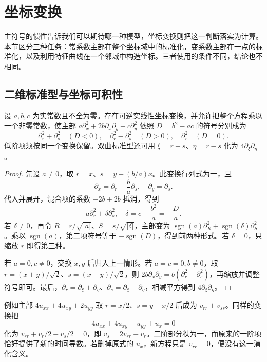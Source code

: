 \section{坐标变换}
\label{b2:sec:0803}

主符号的惯性告诉我们可以期待哪一种模型，坐标变换则把这一判断落实为计算。本节区分三种任务：常系数主部在整个坐标域中的标准化，变系数主部在一点的标准化，以及利用特征曲线在一个邻域中构造坐标。三者使用的条件不同，结论也不相同。

\subsection{二维标准型与坐标可积性}
\label{b2:subsec:080301}

\begin{theorem}\label{b2:thm:08-constant-canonical}
设 \(a,b,c\) 为实常数且不全为零。存在可逆实线性坐标变换，并允许把整个方程乘以一个非零常数，使主部 \(a\partial_x^2+2b\partial_x\partial_y+c\partial_y^2\) 依照 \(D=b^2-ac\) 的符号分别成为
\[
 \partial_r^2+\partial_s^2\quad(D<0),\quad
 \partial_r^2-\partial_s^2\quad(D>0),\quad
 \partial_r^2\quad(D=0).
\]
低阶项须按同一个变换保留。双曲标准型还可用 \(\xi=r+s\)、\(\eta=r-s\) 化为 \(4\partial_\xi\partial_\eta\)。
\end{theorem}
\begin{proof}
先设 \(a\ne0\)，取 \(r=x\)、\(s=y-(b/a)x\)。此变换行列式为一，且
\[
 \partial_x=\partial_r-\frac ba\partial_s,\quad
 \partial_y=\partial_s.
\]
代入并展开，混合项的系数 \(-2b+2b\) 抵消，得到
\[
 a\partial_r^2+\delta\partial_s^2,\quad
 \delta=c-\frac{b^2}{a}=-\frac Da.
\]
若 \(\delta\ne0\)，再令 \(R=r/\sqrt{|a|}\)、\(S=s/\sqrt{|\delta|}\)，主部变为
\(\operatorname{sgn}(a)\partial_R^2+\operatorname{sgn}(\delta)\partial_S^2\)。乘以 \(\operatorname{sgn}(a)\)，第二项符号等于 \(-\operatorname{sgn}(D)\)，得到前两种形式。若 \(\delta=0\)，只缩放 \(r\) 即得第三种。

若 \(a=0,c\ne0\)，交换 \(x,y\) 后归入上一情形。若 \(a=c=0,b\ne0\)，取 \(r=(x+y)/\sqrt2\)、\(s=(x-y)/\sqrt2\)，则 \(2b\partial_x\partial_y=b(\partial_r^2-\partial_s^2)\)，再缩放并调整符号即可。最后，\(\partial_r=\partial_\xi+\partial_\eta\)、\(\partial_s=\partial_\xi-\partial_\eta\)，相减平方得到 \(4\partial_\xi\partial_\eta\)。
\end{proof}

例如主部 \(4u_{xx}+4u_{xy}+2u_{yy}\) 取 \(r=x/2\)、\(s=y-x/2\) 后成为 \(v_{rr}+v_{ss}\)。同样的变换把
\[
 4u_{xx}+4u_{xy}+u_{yy}+u_x=0
\]
化为 \(v_{rr}+v_r/2-v_s/2=0\)，即 \(v_s=2v_{rr}+v_r\)。二阶部分秩为一，而原来的一阶项恰好提供了新的时间导数。若删掉原式的 \(u_x\)，新方程只是 \(v_{rr}=0\)，便没有这一演化含义。

